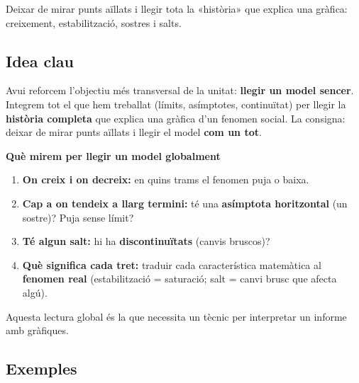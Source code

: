 %
{Deixar de mirar punts aïllats i llegir tota la «història» que explica una gràfica: creixement, estabilització, sostres i salts.}

\subsection{Idea clau}

Avui reforcem l'objectiu més transversal de la unitat: \textbf{llegir un model
sencer}. Integrem tot el que hem treballat (límits, asímptotes, continuïtat) per
llegir la \textbf{història completa} que explica una gràfica d'un fenomen social. La
consigna: deixar de mirar punts aïllats i llegir el model \textbf{com un tot}.

\begin{idea}
\textbf{Què mirem per llegir un model globalment}
\begin{enumerate}[leftmargin=1.6em, itemsep=2pt]
  \item \textbf{On creix i on decreix:} en quins trams el fenomen puja o baixa.
  \item \textbf{Cap a on tendeix a llarg termini:} té una \textbf{asímptota
        horitzontal} (un sostre)? Puja sense límit?
  \item \textbf{Té algun salt:} hi ha \textbf{discontinuïtats} (canvis bruscos)?
  \item \textbf{Què significa cada tret:} traduir cada característica matemàtica al
        \textbf{fenomen real} (estabilització = saturació; salt = canvi brusc que
        afecta algú).
\end{enumerate}
Aquesta lectura global és la que necessita un tècnic per interpretar un informe amb
gràfiques.
\end{idea}

\subsection{Exemples}

